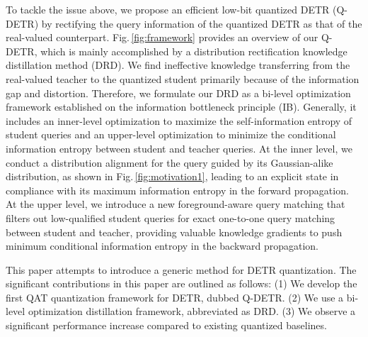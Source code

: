 \documentclass[10pt,twocolumn,letterpaper]{article}
\begin{document}
To tackle the issue above, we propose an efficient low-bit quantized DETR (Q-DETR) by rectifying the query information of the quantized DETR as that of the real-valued counterpart. Fig.\,\ref{fig:framework} provides an overview of our Q-DETR, which is mainly accomplished by a distribution rectification knowledge distillation method (DRD). We find ineffective knowledge transferring from the real-valued teacher to the quantized student primarily because of the information gap and distortion. 
%
Therefore, we formulate our DRD as a bi-level optimization framework established on the information bottleneck principle (IB). Generally, it includes an inner-level optimization to maximize the self-information entropy of student queries and an upper-level optimization to minimize the conditional information entropy between student and teacher queries.
%
At the inner level, we conduct a distribution alignment for the query guided by its Gaussian-alike distribution, as shown in Fig.\,\ref{fig:motivation1}, leading to an explicit state in compliance with its maximum information entropy in the forward propagation. At the upper level, we introduce a new foreground-aware query matching that filters out low-qualified student queries for exact one-to-one query matching between student and teacher, providing valuable knowledge gradients to push minimum conditional information entropy in the backward propagation.


This paper attempts to introduce a generic method for DETR quantization. The significant contributions in this paper are outlined as follows: 
%
(1) We develop the first QAT quantization framework for DETR, dubbed Q-DETR.
(2) We use a bi-level optimization distillation framework, abbreviated as DRD.
(3) We observe a significant performance increase compared to existing quantized baselines.



% 


% 
\end{document}
